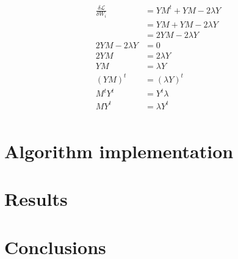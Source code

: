 \documentclass[12pt,journal]{IEEEtran}
\begin{document}
    \begin{equation*}
        \begin{aligned}
            \frac{\delta \mathcal{L}}{\delta W_i} &= Y M^t + Y M - 2 \lambda Y\\
                                                  &= Y M + Y M - 2 \lambda Y\\
                                                  &= 2 Y M - 2 \lambda Y \\
                              2 Y M - 2 \lambda Y &= 0 \\
                                            2 Y M &= 2 \lambda Y \\
                                              Y M &= \lambda Y \\
                                              (Y M)^t &= (\lambda Y)^t \\
                                              M^t Y^t &= Y^t \lambda \\
                                              M Y^t &= \lambda Y^t \\
        \end{aligned}
    \end{equation*}


\section{Algorithm implementation}

\section{Results}

\section{Conclusions}



\end{document}
